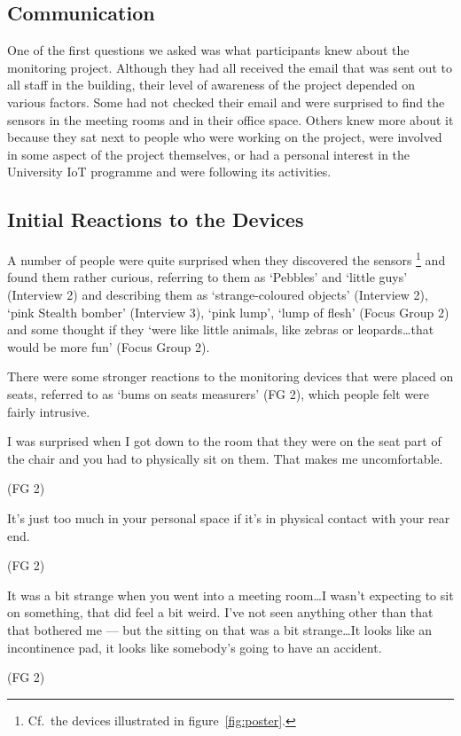 \subsection{Communication}
\label{sec:communication}

One of the first questions we asked was what participants knew about
the monitoring project. Although they had all received the email that
was sent out to all staff in the building, their level of awareness of
the project depended on various factors. Some had not checked their
email and were surprised to find the sensors in the meeting rooms and
in their office space. Others knew more about it because they sat next
to people who were working on the project, were involved in some
aspect of the project themselves, or had a personal interest in the
University IoT programme and were following its activities.

\subsection{Initial Reactions to the Devices}
\label{sec:init-reactions}

A number of people were quite surprised when they discovered the
sensors%
\footnote{ 
Cf.\ the devices illustrated in figure~\ref{fig:poster}.
}
and found them rather curious, referring to them as `Pebbles’
and ‘little guys’ (Interview 2) and describing them as
`strange-coloured objects’ (Interview 2), `pink Stealth bomber’
(Interview 3), `pink lump’, `lump of flesh’ (Focus Group 2) and some
thought if they `were like little animals, like zebras or
leopards\ldots that would be more fun’ (Focus Group 2).

There were some stronger reactions to the monitoring devices that were
placed on seats, referred to as `bums on seats measurers’ (FG 2),
which people felt were fairly intrusive.

\begin{qt}I was surprised when I got down to the room that they were on the
seat part of the chair and you had to physically sit on them. That
makes me uncomfortable.\end{qt} (FG 2)

\begin{qt}It’s just too much in your personal space if it’s in
  physical contact with your rear end.\end{qt} (FG 2)

\begin{qt}It was a bit strange when you went into a meeting room…I wasn’t
expecting to sit on something, that did feel a bit weird. I’ve not
seen anything other than that that bothered me --– but the sitting on
that was a bit strange\ldots It looks like an incontinence pad, it looks
like somebody’s going to have an accident.\end{qt} (FG 2)

